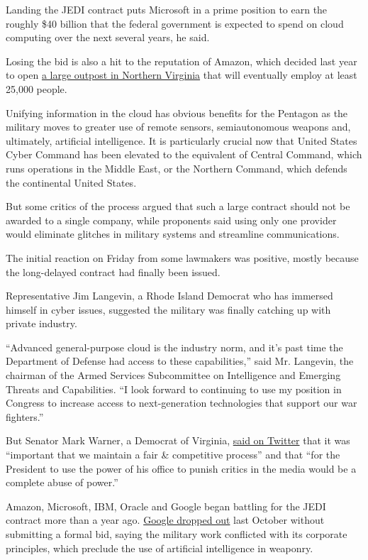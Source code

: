 Landing the JEDI contract puts Microsoft in a prime position to earn the
roughly \$40 billion that the federal government is expected to spend on
cloud computing over the next several years, he said.

Losing the bid is also a hit to the reputation of Amazon, which decided
last year to open
\href{https://www.nytimes.com/2018/11/13/business/national-landing-amazon-va.html}{a
large outpost in Northern Virginia} that will eventually employ at least
25,000 people.

Unifying information in the cloud has obvious benefits for the Pentagon
as the military moves to greater use of remote sensors, semiautonomous
weapons and, ultimately, artificial intelligence. It is particularly
crucial now that United States Cyber Command has been elevated to the
equivalent of Central Command, which runs operations in the Middle East,
or the Northern Command, which defends the continental United States.

But some critics of the process argued that such a large contract should
not be awarded to a single company, while proponents said using only one
provider would eliminate glitches in military systems and streamline
communications.

The initial reaction on Friday from some lawmakers was positive, mostly
because the long-delayed contract had finally been issued.

Representative Jim Langevin, a Rhode Island Democrat who has immersed
himself in cyber issues, suggested the military was finally catching up
with private industry.

``Advanced general-purpose cloud is the industry norm, and it's past
time the Department of Defense had access to these capabilities,'' said
Mr. Langevin, the chairman of the Armed Services Subcommittee on
Intelligence and Emerging Threats and Capabilities. ``I look forward to
continuing to use my position in Congress to increase access to
next-generation technologies that support our war fighters.''

But Senator Mark Warner, a Democrat of Virginia,
\href{https://twitter.com/MarkWarner/status/1157341554346008576}{said on
Twitter} that it was ``important that we maintain a fair \& competitive
process'' and that ``for the President to use the power of his office to
punish critics in the media would be a complete abuse of power.''

Amazon, Microsoft, IBM, Oracle and Google began battling for the JEDI
contract more than a year ago.
\href{https://www.bloomberg.com/news/articles/2018-10-08/google-drops-out-of-pentagon-s-10-billion-cloud-competition}{Google
dropped out} last October without submitting a formal bid, saying the
military work conflicted with its corporate principles, which preclude
the use of artificial intelligence in weaponry.

